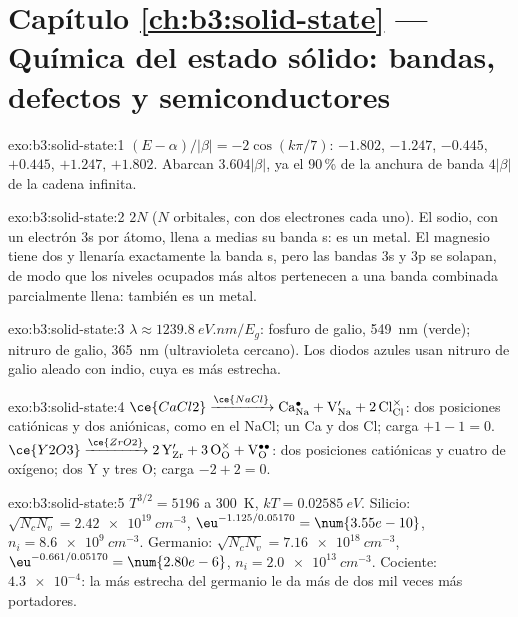 \section*{Capítulo \ref{ch:b3:solid-state} --- Química del estado sólido: bandas, defectos y semiconductores}

\begin{solution}{exo:b3:solid-state:1}
$(E - \alpha)/|\beta| = -2\cos(k\pi/7)$: $-1.802$, $-1.247$, $-0.445$, $+0.445$, $+1.247$, $+1.802$. Abarcan
$3.604|\beta|$, ya el 90\,\% de la anchura de banda $4|\beta|$ de la cadena infinita.
\end{solution}

\begin{solution}{exo:b3:solid-state:2}
$2N$ ($N$ orbitales, con dos electrones cada uno). El sodio, con un electrón 3s por átomo, llena
a medias su banda s: es un metal. El magnesio tiene dos y llenaría exactamente la banda s,
pero las bandas 3s y 3p se solapan, de modo que los niveles ocupados más altos pertenecen a una
banda combinada parcialmente llena: también es un metal.
\end{solution}

\begin{solution}{exo:b3:solid-state:3}
$\lambda \approx \qty{1239.8}{eV.nm}/E_g$: fosfuro de galio, \qty{549}{nm} (verde); nitruro de galio, \qty{365}{nm}
(ultravioleta cercano). Los diodos azules usan nitruro de galio aleado con indio, cuya
 es más estrecha.
\end{solution}

\begin{solution}{exo:b3:solid-state:4}
$\ce{CaCl2} \xrightarrow{\ce{NaCl}} \mathrm{Ca_{Na}^{\bullet} + V_{Na}' + 2\,Cl_{Cl}^{\times}}$: dos posiciones catiónicas y dos aniónicas, como en el NaCl; un Ca y
dos Cl; carga $+1 - 1 = 0$. $\ce{Y2O3} \xrightarrow{\ce{ZrO2}} \mathrm{2\,Y_{Zr}' + 3\,O_O^{\times} + V_O^{\bullet\bullet}}$: dos posiciones catiónicas y cuatro de oxígeno; dos Y
y tres O; carga $-2 + 2 = 0$.
\end{solution}

\begin{solution}{exo:b3:solid-state:5}
$T^{3/2} = 5196$ a \qty{300}{K}, $kT = \qty{0.02585}{eV}$. Silicio: $\sqrt{N_cN_v} = \qty{2.42e19}{cm^{-3}}$, $\eu^{-1.125/0.05170} = \num{3.55e-10}$,
$n_i = \qty{8.6e9}{cm^{-3}}$. Germanio: $\sqrt{N_cN_v} = \qty{7.16e18}{cm^{-3}}$, $\eu^{-0.661/0.05170} = \num{2.80e-6}$, $n_i = \qty{2.0e13}{cm^{-3}}$. Cociente:
$\num{4.3e-4}$: la  más estrecha del germanio le da más de dos mil veces más
portadores.
\end{solution}

